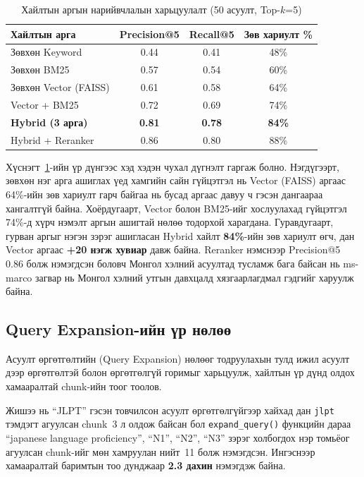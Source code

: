 \documentclass[11pt,a4paper]{article}
\begin{document}
\begin{table}[H]
\centering
\caption{Хайлтын аргын нарийвчлалын харьцуулалт (50 асуулт, Top-$k$=5)}
\label{tab:precision_compare}
\begin{tabular}{|l|c|c|c|}
\hline
\textbf{Хайлтын арга} & \textbf{Precision@5} & \textbf{Recall@5} & \textbf{Зөв хариулт \%} \\
\hline
Зөвхөн Keyword              & 0.44 & 0.41 & 48\% \\
\hline
Зөвхөн BM25                 & 0.57 & 0.54 & 60\% \\
\hline
Зөвхөн Vector (FAISS)       & 0.61 & 0.58 & 64\% \\
\hline
Vector + BM25                & 0.72 & 0.69 & 74\% \\
\hline
\textbf{Hybrid (3 арга)}     & \textbf{0.81} & \textbf{0.78} & \textbf{84\%} \\
\hline
Hybrid + Reranker            & 0.86 & 0.80 & 88\% \\
\hline
\end{tabular}
\end{table}

Хүснэгт~\ref{tab:precision_compare}-ийн үр дүнгээс хэд хэдэн чухал дүгнэлт гаргаж болно. Нэгдүгээрт, зөвхөн нэг арга ашиглах үед хамгийн сайн гүйцэтгэл нь Vector (FAISS) аргаас 64\%-ийн зөв хариулт гарч байгаа нь бусад аргаас давуу ч гэсэн дангаараа хангалтгүй байна. Хоёрдугаарт, Vector болон BM25-ийг хослуулахад гүйцэтгэл 74\%-д хүрч нэмэлт аргын ашигтай нөлөө тодорхой харагдана. Гуравдугаарт, гурван аргыг нэгэн зэрэг ашигласан Hybrid хайлт \textbf{84\%}-ийн зөв хариулт өгч, дан Vector аргаас \textbf{+20 нэгж хувиар} давж байна. Reranker нэмснээр Precision@5 0.86 болж нэмэгдсэн боловч Монгол хэлний асуултад тусламж бага байсан нь ms-marco загвар нь Монгол хэлний утгын давхцалд хязгаарлагдмал гэдгийг харуулж байна.

\subsection{Query Expansion-ийн үр нөлөө}

Асуулт өргөтгөлтийн (Query Expansion) нөлөөг тодруулахын тулд ижил асуулт дээр өргөтгөлтэй болон өргөтгөлгүй горимыг харьцуулж, хайлтын үр дүнд олдох хамааралтай chunk-ийн тоог тоолов.

Жишээ нь ``JLPT'' гэсэн товчилсон асуулт өргөтгөлгүйгээр хайхад дан \texttt{jlpt} тэмдэгт агуулсан chunk~3 л олдож байсан бол \texttt{expand\_query()} функцийн дараа ``japanese language proficiency'', ``N1'', ``N2'', ``N3'' зэрэг холбогдох нэр томьёог агуулсан chunk-ийг мөн хамруулан нийт~11 болж нэмэгдсэн. Ингэснээр хамааралтай баримтын тоо дунджаар \textbf{2.3 дахин} нэмэгдэж байна.
\end{document}
